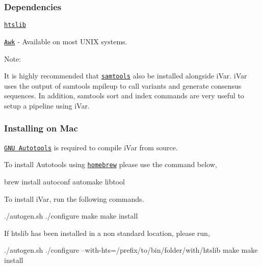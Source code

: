 \subsubsection*{Dependencies}


\begin{DoxyItemize}
\item \href{http://www.htslib.org/download/}{\tt htslib}
\item \href{https://www.cs.princeton.edu/~bwk/btl.mirror/}{\tt Awk} -\/ Available on most U\+N\+IX systems.
\end{DoxyItemize}

Note\+:
\begin{DoxyItemize}
\item It is highly recommended that \href{https://github.com/samtools/samtools}{\tt samtools} also be installed alongside i\+Var. i\+Var uses the output of samtools mpileup to call variants and generate consensus sequences. In addition, samtools {\ttfamily sort} and {\ttfamily index} commands are very useful to setup a pipeline using i\+Var.
\end{DoxyItemize}

\subsubsection*{Installing on Mac}

\href{https://www.gnu.org/software/automake/manual/html_node/Autotools-Introduction.html#Autotools-Introduction}{\tt G\+NU Autotools} is required to compile i\+Var from source.

To install Autotools using \href{https://brew.sh/}{\tt homebrew} please use the command below,


\begin{DoxyCode}
brew install autoconf automake libtool
\end{DoxyCode}


To install i\+Var, run the following commands.


\begin{DoxyCode}
./autogen.sh
./configure
make
make install
\end{DoxyCode}


If htslib has been installed in a non standard location, please run,


\begin{DoxyCode}
./autogen.sh
./configure --with-hts=/prefix/to/bin/folder/with/htslib
make
make install
\end{DoxyCode}


